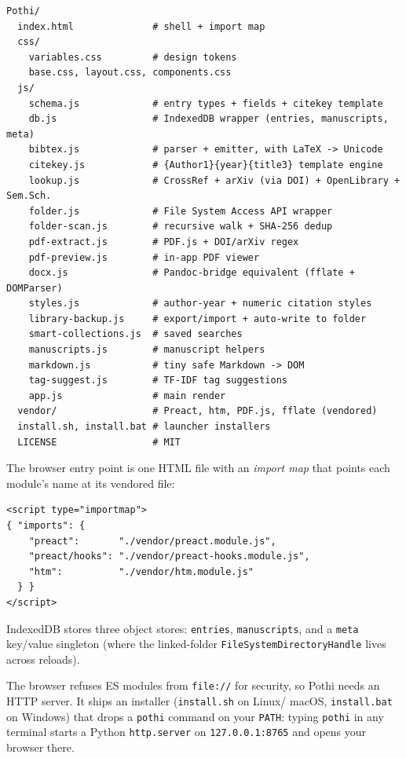 \documentclass[11pt]{article}
\begin{document}
\begin{lstlisting}
Pothi/
  index.html              # shell + import map
  css/
    variables.css         # design tokens
    base.css, layout.css, components.css
  js/
    schema.js             # entry types + fields + citekey template
    db.js                 # IndexedDB wrapper (entries, manuscripts, meta)
    bibtex.js             # parser + emitter, with LaTeX -> Unicode
    citekey.js            # {Author1}{year}{title3} template engine
    lookup.js             # CrossRef + arXiv (via DOI) + OpenLibrary + Sem.Sch.
    folder.js             # File System Access API wrapper
    folder-scan.js        # recursive walk + SHA-256 dedup
    pdf-extract.js        # PDF.js + DOI/arXiv regex
    pdf-preview.js        # in-app PDF viewer
    docx.js               # Pandoc-bridge equivalent (fflate + DOMParser)
    styles.js             # author-year + numeric citation styles
    library-backup.js     # export/import + auto-write to folder
    smart-collections.js  # saved searches
    manuscripts.js        # manuscript helpers
    markdown.js           # tiny safe Markdown -> DOM
    tag-suggest.js        # TF-IDF tag suggestions
    app.js                # main render
  vendor/                 # Preact, htm, PDF.js, fflate (vendored)
  install.sh, install.bat # launcher installers
  LICENSE                 # MIT
\end{lstlisting}

The browser entry point is one HTML file with an \emph{import map} that points
each module's name at its vendored file:

\begin{lstlisting}
<script type="importmap">
{ "imports": {
    "preact":       "./vendor/preact.module.js",
    "preact/hooks": "./vendor/preact-hooks.module.js",
    "htm":          "./vendor/htm.module.js"
  } }
</script>
\end{lstlisting}

IndexedDB stores three object stores: \texttt{entries}, \texttt{manuscripts},
and a \texttt{meta} key/value singleton (where the linked-folder
\texttt{FileSystemDirectoryHandle} lives across reloads).

The browser refuses ES modules from \texttt{file://} for security, so Pothi
needs an HTTP server. It ships an installer (\texttt{install.sh} on Linux/
macOS, \texttt{install.bat} on Windows) that drops a \texttt{pothi} command
on your \texttt{PATH}: typing \texttt{pothi} in any terminal starts a Python
\texttt{http.server} on \texttt{127.0.0.1:8765} and opens your browser there.
\end{document}

